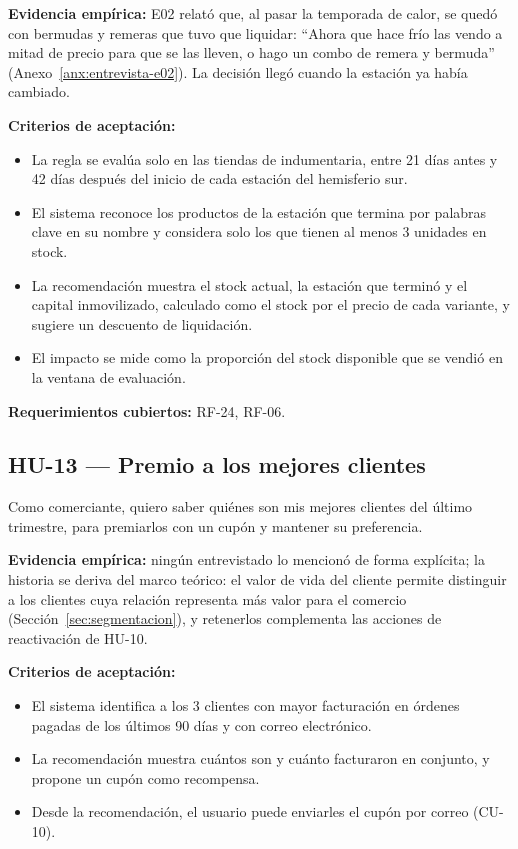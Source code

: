 \noindent\textbf{Evidencia empírica:} E02 relató que, al pasar la temporada de calor, se quedó con bermudas y remeras que tuvo que liquidar: \enquote{Ahora que hace frío las vendo a mitad de precio para que se las lleven, o hago un combo de remera y bermuda} (Anexo~\ref{anx:entrevista-e02}). La decisión llegó cuando la estación ya había cambiado.

\noindent\textbf{Criterios de aceptación:}
\begin{itemize}
    \item La regla se evalúa solo en las tiendas de indumentaria, entre 21 días antes y 42 días después del inicio de cada estación del hemisferio sur.
    \item El sistema reconoce los productos de la estación que termina por palabras clave en su nombre y considera solo los que tienen al menos 3 unidades en stock.
    \item La recomendación muestra el stock actual, la estación que terminó y el capital inmovilizado, calculado como el stock por el precio de cada variante, y sugiere un descuento de liquidación.
    \item El impacto se mide como la proporción del stock disponible que se vendió en la ventana de evaluación.
\end{itemize}

\noindent\textbf{Requerimientos cubiertos:} RF-24, RF-06.

\subsection{HU-13 --- Premio a los mejores clientes}
\label{sec:hu-13}

Como comerciante, quiero saber quiénes son mis mejores clientes del último trimestre, para premiarlos con un cupón y mantener su preferencia.

\noindent\textbf{Evidencia empírica:} ningún entrevistado lo mencionó de forma explícita; la historia se deriva del marco teórico: el valor de vida del cliente permite distinguir a los clientes cuya relación representa más valor para el comercio (Sección~\ref{sec:segmentacion}), y retenerlos complementa las acciones de reactivación de HU-10.

\noindent\textbf{Criterios de aceptación:}
\begin{itemize}
    \item El sistema identifica a los 3 clientes con mayor facturación en órdenes pagadas de los últimos 90 días y con correo electrónico.
    \item La recomendación muestra cuántos son y cuánto facturaron en conjunto, y propone un cupón como recompensa.
    \item Desde la recomendación, el usuario puede enviarles el cupón por correo (CU-10).
\end{itemize}


